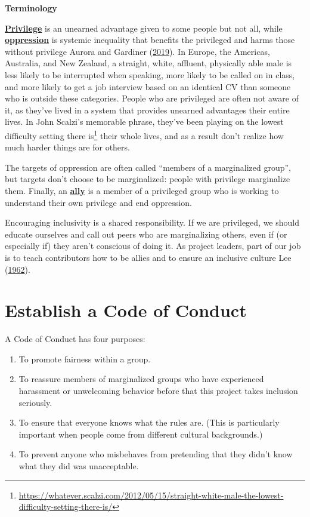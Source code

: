 \documentclass[
]{krantz}
\providecommand{\tightlist}{%
  \setlength{\itemsep}{0pt}\setlength{\parskip}{0pt}}
\renewenvironment{quote}{\begin{VF}}{\end{VF}}
\renewcommand{\href}[2]{#2\footnote{\url{#1}}}
\newcommand{\gref}[2]{\hyperlink{#2}{\textbf{#1}}}
\begin{document}
\begin{quote}
\textbf{Terminology}

\gref{Privilege}{privilege} is an unearned advantage given to some people but not all,
while \gref{oppression}{oppression} is systemic inequality that benefits the privileged
and harms those without privilege Aurora and Gardiner (\protect\hyperlink{ref-Auro2019}{2019}).
In Europe, the Americas, Australia, and New Zealand,
a straight, white, affluent, physically able male
is less likely to be interrupted when speaking,
more likely to be called on in class,
and more likely to get a job interview based on an identical CV
than someone who is outside these categories.
People who are privileged are often not aware of it,
as they've lived in a system that provides unearned advantages their entire lives.
In John Scalzi's memorable phrase,
they've been playing on \href{https://whatever.scalzi.com/2012/05/15/straight-white-male-the-lowest-difficulty-setting-there-is/}{the lowest difficulty setting there is}
their whole lives,
and as a result don't realize how much harder things are for others.

The targets of oppression are often called ``members of a marginalized group'',
but targets don't choose to be marginalized:
people with privilege marginalize them.
Finally,
an \gref{ally}{ally} is a member of a privileged group
who is working to understand their own privilege and end oppression.
\end{quote}

Encouraging inclusivity is a shared responsibility.
If we are privileged,
we should educate ourselves and call out peers who are marginalizing others,
even if (or especially if) they aren't conscious of doing it.
As project leaders,
part of our job is to teach contributors how to be allies
and to ensure an inclusive culture Lee (\protect\hyperlink{ref-Lee1962}{1962}).

\hypertarget{teams-coc}{%
\section{Establish a Code of Conduct}\label{teams-coc}}

A Code of Conduct has four purposes:

\begin{enumerate}
\def\labelenumi{\arabic{enumi}.}
\tightlist
\item
  To promote fairness within a group.
\item
  To reassure members of marginalized groups
  who have experienced harassment or unwelcoming behavior before
  that this project takes inclusion seriously.
\item
  To ensure that everyone knows what the rules are.
  (This is particularly important when people come from different cultural backgrounds.)
\item
  To prevent anyone who misbehaves from pretending that
  they didn't know what they did was unacceptable.
\end{enumerate}
\end{document}
